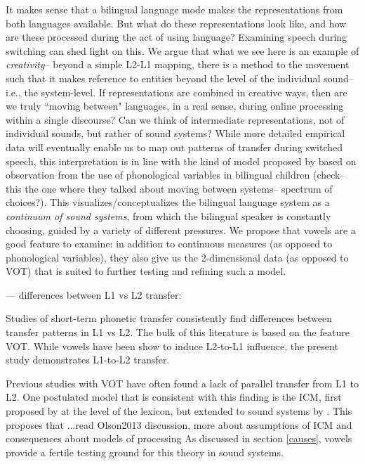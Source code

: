 \documentclass[12 pt]{article}
\begin{document}
\alert{It makes sense that a bilingual language mode makes the representations from both languages available. But what do these representations look like, and how are these processed during the act of using language? Examining speech during switching can shed light on this. We argue that what we see here is an example of \textit{creativity}-- beyond a simple L2-L1 mapping, there is a method to the movement such that it makes reference to entities beyond the level of the individual sound-- i.e., the system-level. If representations are combined in creative ways, then are we truly ``moving between" languages, in a real sense, during online processing within a single discourse? Can we think of intermediate representations, not of individual sounds, but rather of sound systems? While more detailed empirical data will eventually enable us to map out patterns of transfer during switched speech, this interpretation is in line with the kind of model proposed by \cite{khattab2013phonetic} based on observation from the use of phonological variables in bilingual children (check-- this the one where they talked about moving between systems-- spectrum of choices?). This visualizes/conceptualizes the bilingual language system as a \textit{continuum of sound systems}, from which the bilingual speaker is constantly choosing, guided by a variety of different pressures. We propose that vowels are a good feature to examine: in addition to continuous measures (as opposed to phonological variables), they also give us the 2-dimensional data (as opposed to VOT) that is suited to further testing and refining such a model.}


--- differences between L1 vs L2 transfer:

Studies of short-term phonetic transfer consistently find differences between transfer patterns in L1 vs L2. The bulk of this literature is based on the feature VOT. While vowels have been show to induce L2-to-L1 influence, the present study demonstrates L1-to-L2 transfer. 

Previous studies with VOT have often found a lack of parallel transfer from L1 to L2. One postulated model that is consistent with this finding is the ICM, first proposed by \cite{green1986control} at the level of the lexicon, but extended to sound systems by \cite{olson2013bilingual,tsui2019impact}. This proposes that ...\alert{read Olson2013 discussion, more about assumptions of ICM and consequences about models of processing}  As discussed in section \ref{causes}, vowels provide a fertile testing ground for this theory in sound systems.
\end{document}
